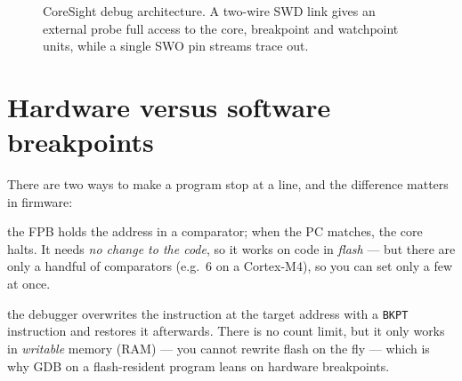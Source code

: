 \documentclass[11pt,a4paper,oneside]{book}
\newcommand{\code}[1]{\texttt{#1}}
\begin{document}
\begin{figure}[h]
\centering
{}
\caption{CoreSight debug architecture. A two-wire SWD link gives an external
probe full access to the core, breakpoint and watchpoint units, while a single
SWO pin streams trace out.}
\label{fig:coresight}
\end{figure}

\section{Hardware versus software breakpoints}
There are two ways to make a program stop at a line, and the difference matters
in firmware:
\begin{description}[leftmargin=1.6cm,style=nextline]
  \item[Hardware breakpoint] the FPB holds the address in a comparator; when the
        PC matches, the core halts. It needs \emph{no change to the code}, so it
        works on code in \emph{flash} --- but there are only a handful of
        comparators (e.g.\ 6 on a Cortex-M4), so you can set only a few at once.
  \item[Software breakpoint] the debugger overwrites the instruction at the
        target address with a \code{BKPT} instruction and restores it
        afterwards. There is no count limit, but it only works in
        \emph{writable} memory (RAM) --- you cannot rewrite flash on the fly ---
        which is why GDB on a flash-resident program leans on hardware
        breakpoints.
\end{description}
\end{document}
